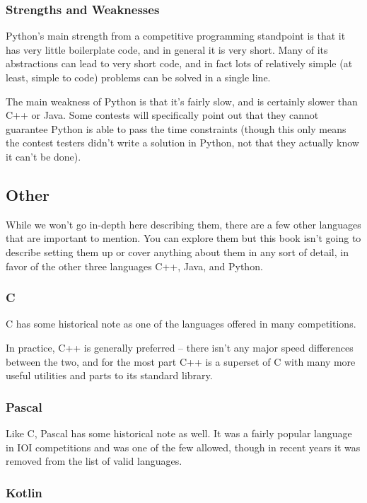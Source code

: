 \subsubsection{Strengths and Weaknesses}

Python's main strength from a competitive programming standpoint is that it has very little boilerplate code, and in general it is very short. Many of its abstractions can lead to very short code, and in fact lots of relatively simple (at least, simple to code) problems can be solved in a single line.

The main weakness of Python is that it's fairly slow, and is certainly slower than C++ or Java. Some contests will specifically point out that they cannot guarantee Python is able to pass the time constraints (though this only means the contest testers didn't write a solution in Python, not that they actually know it can't be done).

\subsection{Other}

While we won't go in-depth here describing them, there are a few other languages that are important to mention. You can explore them but this book isn't going to describe setting them up or cover anything about them in any sort of detail, in favor of the other three languages C++, Java, and Python.

\subsubsection{C}

C has some historical note as one of the languages offered in many competitions.

In practice, C++ is generally preferred -- there isn't any major speed differences between the two, and for the most part C++ is a superset of C with many more useful utilities and parts to its standard library.

\subsubsection{Pascal}

Like C, Pascal has some historical note as well. It was a fairly popular language in IOI competitions and was one of the few allowed, though in recent years it was removed from the list of valid languages.

\subsubsection{Kotlin}

